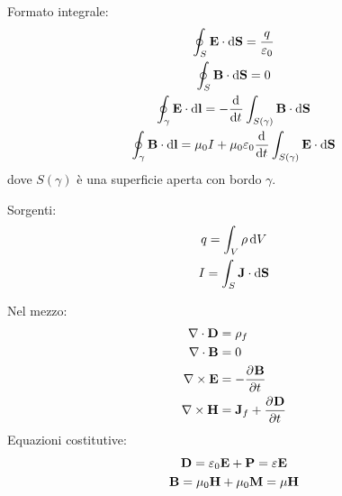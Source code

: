 Formato integrale:
\begin{gather}
    \oint_S \E \sde = \frac{q}{\eps_0} \\
    \oint_S \B \sde = 0 \\
    \oint_\gamma \E \lde = - \der{t} \int_{S(\gamma)} \B \sde \\
    \oint_\gamma \B \lde = \mu_0 I + \mu_0\eps_0 \der{t} \int_{S(\gamma)} \E \sde
\end{gather}
dove $S(\gamma)$ è una superficie aperta con bordo $\gamma$.

Sorgenti:
\begin{gather}
    q = \int_V \rho \, \mathrm{d} V \\
    I = \int_S \mathbf{J} \cdot \mathrm{d} \mathbf{S}
\end{gather}

Nel mezzo:
\begin{align}
    \diver \D & = \rho\free \\
    \diver \B & = 0 \\
    \curl \E & = - \parder[\B]{t} \\
    \curl \H & = \dcurr\free + \parder[\D]{t}
\end{align}
Equazioni costitutive:
\begin{gather}
    \mathbf{D} = \varepsilon_0 \mathbf{E} + \mathbf{P} = \varepsilon \mathbf{E} \\
    \mathbf{B} = \mu_0 \mathbf{H} + \mu_0 \mathbf{M} = \mu \mathbf{H}
\end{gather}

